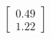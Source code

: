 \documentclass[preview]{standalone}
\begin{document}
\begin{align*}
\begin{bmatrix} 0.49 \\ 1.22 \end{bmatrix}
\end{align*}
\end{document}
